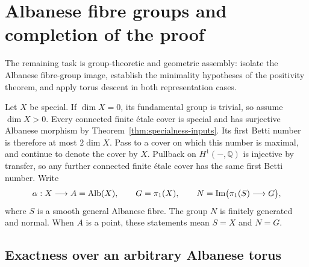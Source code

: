 \section{Albanese fibre groups and completion of the proof}\label{sec:completion}

The remaining task is group-theoretic and geometric assembly: isolate
the Albanese fibre-group image, establish the minimality hypotheses
of the positivity theorem, and apply torus descent in both
representation cases.

Let \(X\) be special. If \(\dim X=0\), its fundamental group is trivial,
so assume \(\dim X>0\). Every connected finite \'etale cover is special
and has surjective Albanese morphism by Theorem~\ref{thm:specialness-inputs}.
Its first Betti number is therefore at most \(2\dim X\). Pass to a cover
on which this number is maximal, and continue to denote the cover by
\(X\). Pullback on \(H^1(-,\mathbb Q)\) is injective by transfer, so
any further connected finite \'etale cover has the same first Betti
number. Write
\[
 \alpha:X\longrightarrow A=\operatorname{Alb}(X),\qquad
 G=\pi_1(X),\qquad N=\operatorname{Im}\bigl(\pi_1(S)\longrightarrow G\bigr),
\]
where \(S\) is a smooth general Albanese fibre. The group \(N\) is
finitely generated and normal. When \(A\) is a point, these statements
mean \(S=X\) and \(N=G\).

\subsection{Exactness over an arbitrary Albanese torus}

